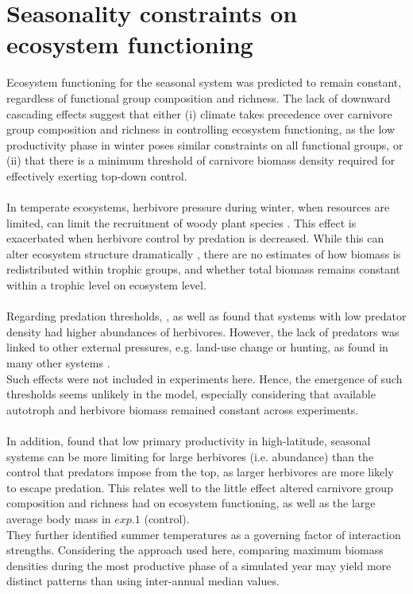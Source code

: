 \section{Seasonality constraints on ecosystem functioning}
Ecosystem functioning for the seasonal system was predicted to remain constant, regardless of functional group composition and richness. The lack of downward cascading effects suggest that either (i) climate takes precedence over carnivore group composition and richness in controlling ecosystem functioning, as the low productivity phase in winter poses similar constraints on all functional groups, or (ii) that there is a minimum threshold of carnivore biomass density required for effectively exerting top-down control.\\\\
In temperate ecosystems, herbivore pressure during winter, when resources are limited, can limit the recruitment of woody plant species \citep{Ripple2014}.
 This effect is exacerbated when herbivore control by predation is decreased. 
While this can alter ecosystem structure dramatically \citep{Terborgh2001, Estes2011}, there are no estimates of how biomass is redistributed within trophic groups, and whether total biomass remains constant within a trophic level on ecosystem level. \\\\
Regarding predation thresholds, \cite{Ripple2012}, as well as \cite{Johnson2009} found that systems with low predator density had higher abundances of herbivores. However, the lack of predators was linked to other external pressures, e.g. land-use change or hunting, as found in many other systems \citep{Estes2011,Ripple2014}. \\
Such effects were not included in experiments here. Hence, the emergence of such thresholds seems unlikely in the model, especially considering that available autotroph and herbivore biomass remained constant across experiments. \\\\
In addition,  \cite{Legagneux2014} found that low primary productivity in high-latitude, seasonal systems can be more limiting for large herbivores (i.e. abundance) than the control that predators impose from the top, as larger herbivores are more likely to escape predation. 
This relates well to the little effect altered carnivore group composition and richness had on ecosystem functioning, as well as the large average body mass in $exp. 1$ (control). \\
They further identified summer temperatures as a governing factor of interaction strengths. Considering the approach used here, comparing maximum biomass densities during the most productive phase of a simulated year may yield more distinct patterns than using inter-annual median values.
